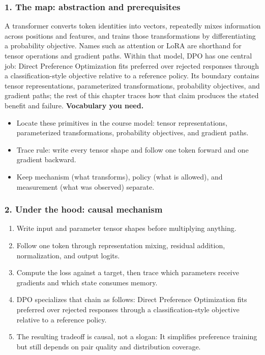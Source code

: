 \subsubsection*{1. The map: abstraction and prerequisites}
A transformer converts token identities into vectors, repeatedly mixes information across positions and features, and trains those transformations by differentiating a probability objective. Names such as attention or LoRA are shorthand for tensor operations and gradient paths.
Within that model, DPO has one central job: Direct Preference Optimization fits preferred over rejected responses through a classification-style objective relative to a reference policy. Its boundary contains tensor representations, parameterized transformations, probability objectives, and gradient paths; the rest of this chapter traces how that claim produces the stated benefit and failure.
\textbf{Vocabulary you need.}\begin{itemize}
\item Locate these primitives in the course model: tensor representations, parameterized transformations, probability objectives, and gradient paths.
\item Trace rule: write every tensor shape and follow one token forward and one gradient backward.
\item Keep mechanism (what transforms), policy (what is allowed), and measurement (what was observed) separate.
\end{itemize}
\subsubsection*{2. Under the hood: causal mechanism}\begin{enumerate}
\item Write input and parameter tensor shapes before multiplying anything.
\item Follow one token through representation mixing, residual addition, normalization, and output logits.
\item Compute the loss against a target, then trace which parameters receive gradients and which state consumes memory.
\item DPO specializes that chain as follows: Direct Preference Optimization fits preferred over rejected responses through a classification-style objective relative to a reference policy.
\item The resulting tradeoff is causal, not a slogan: It simplifies preference training but still depends on pair quality and distribution coverage.
\end{enumerate}
